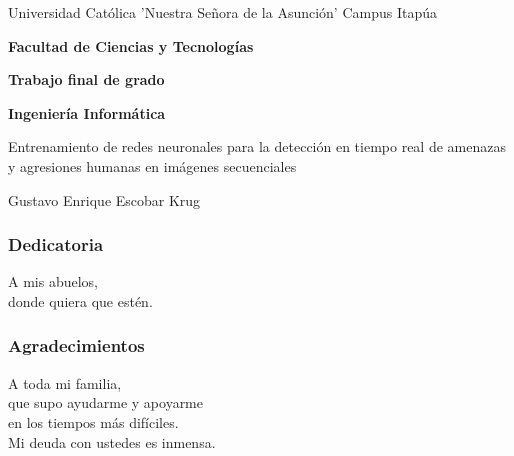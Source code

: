 \documentclass[a4paper,12pt,oneside,spanish]{book}
\begin{document}
\begin{center}
	{\LARGE {Universidad Católica 'Nuestra Señora de la Asunción' Campus Itapúa}}
\end{center}
\vspace*{0.1cm}
\begin{center}
	{\large \rm \textbf {Facultad de Ciencias y Tecnologías}}
\end{center}
\vspace*{0.2cm}
\begin{center}
	{\large \rm \textbf {Trabajo final de grado}}
\end{center}
\vspace*{0.1cm}
\begin{center}
	{\large \rm \textbf {Ingeniería Informática}}
\end{center}		

\baselineskip 30pt
\vspace*{1cm}
\begin{center}
	{\large \rm Entrenamiento de redes neuronales para la detección en tiempo real de amenazas y agresiones humanas en imágenes secuenciales}
\end{center}

\vspace*{1cm}

\begin{center}
	{\sc  Gustavo Enrique Escobar Krug\\}
	\vspace*{0.1cm}
	
\end{center}

\pagebreak

\baselineskip 16pt


\newpage
\setlength{\parskip}{1.3em}
\begin{flushright}
	\subsubsection{Dedicatoria}
	A mis abuelos, \\
	donde quiera que estén.
\end{flushright}

\newpage
\begin{flushright}
	\subsubsection{Agradecimientos}
	A toda mi familia, \\
	que supo ayudarme y apoyarme \\
	en los tiempos más difíciles. \\
	Mi deuda con ustedes es inmensa.
\end{flushright}
\end{document}

